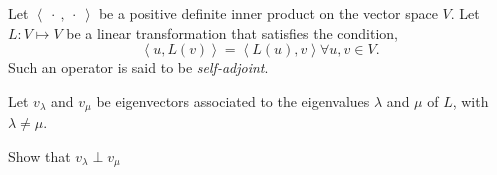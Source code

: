 \documentclass{article}
\begin{document}
  Let $\left<\: \cdot\:,\:\cdot\: \right>$ be a positive definite inner product on the vector space $V$. Let  $L:V \longmapsto V$ be a linear transformation that satisfies the condition,
  \[
  \left<u,L(v) \right> =\left<L(u),v \right> \forall u,v \in V 
  .\] 
  Such an operator is said to be \textit{self-adjoint}.

  Let $v_{\lambda}$ and  $v_{\mu}$ be eigenvectors associated to the eigenvalues  $\lambda$ and  $\mu$ of  $L$, with $\lambda\neq\mu$. 

  Show that $v_{\lambda}\perp v_{\mu}$
\end{document}

